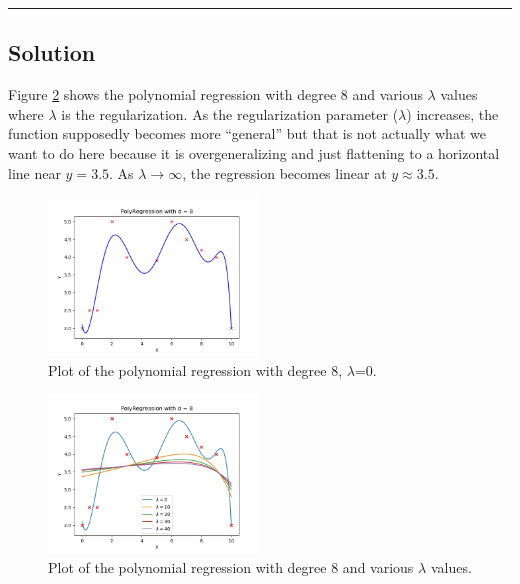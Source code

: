\documentclass{article}
\begin{document}
\begin{aprob}
    \rule{\textwidth}{0.25pt}

    \subsection*{Solution}

    Figure \ref{fig:poly_ref_d8} shows the polynomial regression with degree 8 and various $\lambda$ values where $\lambda$ is the regularization. As the regularization parameter ($\lambda$) increases, the function supposedly becomes more ``general'' but that is not actually what we want to do here because it is overgeneralizing and just flattening to a horizontal line near $y=3.5$. As $\lambda \rightarrow \infty$, the regression becomes linear at $y \approx 3.5$.

    \begin{figure}
        \centering
        \includegraphics[width=0.5\textwidth]{../../../hw1-code/homeworks/poly_regression/fig1.jpg}
        \caption{Plot of the polynomial regression with degree 8, $\lambda$=0.}\label{fig:poly_reg}
    \end{figure}

    \begin{figure}
        \centering
        \includegraphics[width=0.5\textwidth]{../../../hw1-code/homeworks/poly_regression/fig2.jpg}
        \caption{Plot of the polynomial regression with degree 8 and various $\lambda$ values.} \label{fig:poly_ref_d8}
    \end{figure}


\end{aprob}
\end{document}
